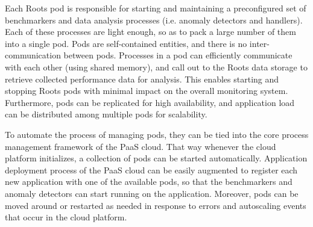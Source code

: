 Each Roots pod is responsible for starting and maintaining a preconfigured set of
benchmarkers and data analysis processes (i.e. anomaly detectors and handlers). 
Each of these processes are light enough, so as to pack a large number of them
into a single pod. Pods are self-contained entities, and there is no inter-communication
between pods. Processes in a pod can efficiently communicate with each other 
(using shared memory), and call out to the Roots data storage to retrieve 
collected performance data for analysis. This enables starting and stopping 
Roots pods with minimal impact on the overall monitoring system. Furthermore, pods
can be replicated for high availability, and application load can be distributed
among multiple pods for scalability.

To automate the process of managing pods, they can be tied into the core
process management framework of the PaaS cloud. That way whenever the cloud
platform initializes, a collection of pods can be started automatically.
Application deployment process of the PaaS cloud can be easily augmented
to register each new application with one of the available pods, so that the
benchmarkers and anomaly detectors can start running on the application.
Moreover, pods can be moved around or restarted as needed in response
to errors and autoscaling events that occur in the cloud platform.